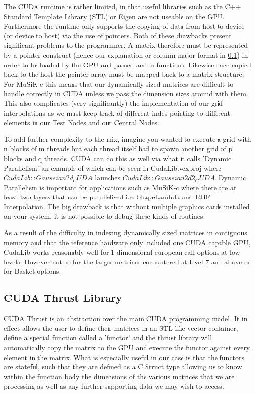 \documentclass[a4paper]{amsart}
\begin{document}
The CUDA runtime is rather limited, in that useful libraries such as the C++ Standard Template Library (STL) or Eigen are not useable on the GPU. Furthermore the runtime only supports the copying of data from host to device (or device to host) via the use of pointers. Both of these drawbacks present significant problems to the programmer. A matrix therefore must be represented by a pointer construct (hence our explanation or column-major format in \ref{}) in order to be loaded by the GPU and passed across functions. Likewise once copied back to the host the pointer array must be mapped back to a matrix structure. For MuSiK-c this means that our dynamically sized matrices are difficult to handle correctly in CUDA unless we pass the dimension sizes around with them. This also complicates (very significantly) the implementation of our grid interpolations as we must keep track of different indes pointing to different elements in our Test Nodes and our Central Nodes.

To add further complexity to the mix, imagine you wanted to execute a grid with n blocks of m threads but each thread itself had to spawn another grid of p blocks and q threads. CUDA can do this as well via what it calls 'Dynamic Parallelism' an example of which can be seen in CudaLib.vcxproj where $CudaLib::Gaussian2d_CUDA$ launches $CudaLib::Gaussian2d2_CUDA$. Dynamic Parallelism is important for applications such as MuSiK-c where there are at least two layers that can be parallelised i.e. ShapeLambda and RBF Interpolation. The big drawback is that without multiple graphics cards installed on your system, it is not possible to debug these kinds of routines. 

As a result of the difficulty in indexing dynamically sized matrices in contiguous memory and that the reference hardware only included one CUDA capable GPU, CudaLib works reasonably well for 1 dimensional european call options at low levels. However not so for the larger matrices encountered at level 7 and above or for Basket options.


\subsection{CUDA Thrust Library}

CUDA Thrust is an abstraction over the main CUDA programming model. It in effect allows the user to define their matrices in an STL-like vector container, define a special function called a 'functor' and the thrust library will automatically copy the matrix to the GPU and execute the functor against every element in the matrix. What is especially useful in our case is that the functors are stateful, such that they are defined as a C Struct type allowing us to know within the function body the dimensions of the various matrices that we are processing as well as any further supporting data we may wish to access.
\end{document}
